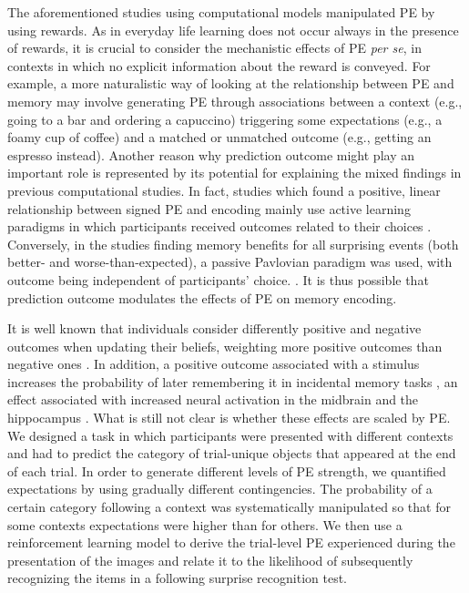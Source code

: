 \documentclass[a4paper,12pt]{article} 			%
\begin{document}
The aforementioned studies using computational models manipulated PE by using rewards. As in everyday life learning does not occur always in the presence of rewards, it is crucial to consider the mechanistic effects of PE \textit{per se}, in contexts in which no explicit information about the reward is conveyed. For example, a more naturalistic way of looking at the relationship between PE and memory may involve generating PE through associations between a context (e.g., going to a bar and ordering a capuccino) triggering some expectations (e.g., a foamy cup of coffee) and a matched or unmatched outcome (e.g., getting an espresso instead). Another reason why prediction outcome might play an important role is represented by its potential for explaining the mixed findings in previous computational studies. In fact, studies which found a positive, linear relationship between signed PE and encoding mainly use active learning paradigms in which participants received outcomes related to their choices \citep{Jang2019, de2018signed}. Conversely, in the studies finding memory benefits for all surprising events (both better- and worse-than-expected), a passive Pavlovian paradigm was used, with outcome being independent of participants’ choice.  \citep{Rouhani2018, Rouhani2021}. It is thus possible that prediction outcome modulates the effects of PE on memory encoding. \par
It is well known that individuals consider differently positive and negative outcomes when updating their beliefs, weighting more positive outcomes than negative ones \citep{Lefebvre2017, sharot2007neural, sharot2016forming}. In addition, a positive outcome associated with a stimulus increases the probability of later remembering it in incidental memory tasks \citep{wittmann2008mesolimbic,mather2011positive, holtje2018electrophysiological}, an effect associated with increased neural activation in the midbrain and the hippocampus \citep{wittmann2005reward}. What is still not clear is whether these effects are scaled by PE. 
We designed a task in which participants were presented with different contexts and had to predict the category of trial-unique objects that appeared at the end of each trial. In order to generate different levels of PE strength, we quantified expectations by using gradually different contingencies. The probability of a certain category following a context was systematically manipulated so that for some contexts expectations were higher than for others. We then use a reinforcement learning model to derive the trial-level PE experienced during the presentation of the images and relate it to the likelihood of subsequently recognizing the items in a following surprise recognition test.
\end{document}
